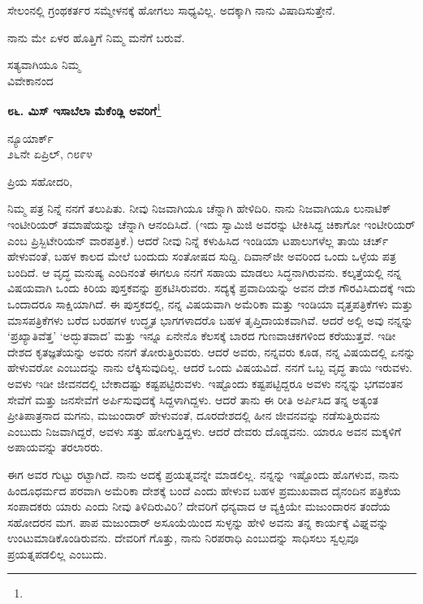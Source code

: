 ಸೇಲಂನಲ್ಲಿ ಗ್ರಂಥಕರ್ತರ ಸಮ್ಮೇಳನಕ್ಕೆ ಹೋಗಲು ಸಾಧ್ಯವಿಲ್ಲ. ಅದಕ್ಕಾಗಿ ನಾನು ವಿಷಾದಿಸುತ್ತೇನೆ.

ನಾನು ಮೇ ಏಳರ ಹೊತ್ತಿಗೆ ನಿಮ್ಮ ಮನೆಗೆ ಬರುವೆ.

\vspace{-0.5cm}

{\flushright
ಸತ್ಯವಾಗಿಯೂ ನಿಮ್ಮ\\ವಿವೇಕಾನಂದ\par}

\begin{center}
\textbf{೮೬. ಮಿಸ್ ಇಸಾಬೆಲಾ ಮೆಕೆಂಡ್ಲಿ ಅವರಿಗೆ}\footnote{}
\end{center}

\vspace{-0.5cm}

\begin{flushright}
ನ್ಯೂಯಾರ್ಕ್\\೨೬ನೇ ಏಪ್ರಿಲ್, ೧೮೯೪
\end{flushright}

\noindent
ಪ್ರಿಯ ಸಹೋದರಿ,

ನಿಮ್ಮ ಪತ್ರ ನಿನ್ನೆ ನನಗೆ ತಲುಪಿತು. ನೀವು ನಿಜವಾಗಿಯೂ ಚೆನ್ನಾಗಿ ಹೇಳಿದಿರಿ. ನಾನು ನಿಜವಾಗಿಯೂ ಲುನಾಟಿಕ್ ಇಂಟೀರಿಯರ್‌ ತಮಾಷೆಯನ್ನು ಚೆನ್ನಾಗಿ ಆನಂದಿಸಿದೆ. (ಇದು ಸ್ವಾಮಿಜಿ ಅವರನ್ನು ಟೀಕಿಸಿದ್ದ ಚಿಕಾಗೋ ಇಂಟೀರಿಯರ್‌ ಎಂಬ ಪ್ರಿಸ್ಬಿಟೇರಿಯನ್ ವಾರಪತ್ರಿಕೆ.) ಆದರೆ ನೀವು ನಿನ್ನೆ ಕಳುಹಿಸಿದ ಇಂಡಿಯಾ ಟಪಾಲುಗಳೆಲ್ಲ ತಾಯಿ ಚರ್ಚ್ ಹೇಳುವಂತೆ, ಬಹಳ ಕಾಲದ ಮೇಲೆ ಬಂದುದು ಸಂತೋಷದ ಸುದ್ದಿ. ದಿವಾನ್‌ಜೀ ಅವರಿಂದ ಒಂದು ಒಳ್ಳೆಯ ಪತ್ರ ಬಂದಿದೆ. ಆ ವೃದ್ಧ ಮನುಷ್ಯ ಎಂದಿನಂತೆ ಈಗಲೂ ನನಗೆ ಸಹಾಯ ಮಾಡಲು ಸಿದ್ಧನಾಗಿರುವನು. ಕಲ್ಕತ್ತೆಯಲ್ಲಿ ನನ್ನ ವಿಷಯವಾಗಿ ಒಂದು ಕಿರಿಯ ಪುಸ್ತಕವನ್ನು ಪ್ರಕಟಿಸಿರುವರು. ಸದ್ಯಕ್ಕೆ ಪ್ರವಾದಿಯನ್ನು ಅವನ ದೇಶ ಗೌರವಿಸಿದುದಕ್ಕೆ ಇದು ಒಂದಾದರೂ ಸಾಕ್ಷಿಯಾಗಿದೆ. ಈ ಪುಸ್ತಕದಲ್ಲಿ, ನನ್ನ ವಿಷಯವಾಗಿ ಅಮೆರಿಕಾ ಮತ್ತು ಇಂಡಿಯಾ ವೃತ್ತಪತ್ರಿಕೆಗಳು ಮತ್ತು ಮಾಸಪತ್ರಿಕೆಗಳು ಬರೆದ ಬರಹಗಳ ಉದ್ಧೃತ ಭಾಗಗಳಾದರೊ ಬಹಳ ತೃಪ್ತಿದಾಯಕವಾಗಿವೆ. ಆದರೆ ಅಲ್ಲಿ ಅವು ನನ್ನನ್ನು ‘ಪ್ರಖ್ಯಾತಿವೆತ್ತ’ ‘ಅದ್ಭುತವಾದ’ ಮತ್ತು ಇನ್ನೂ ಏನೇನೊ ಕೆಲಸಕ್ಕೆ ಬಾರದ ಗುಣವಾಚಕಗಳಿಂದ ಕರೆಯುತ್ತವೆ. ಇಡೀ ದೇಶದ ಕೃತಜ್ಞತೆಯನ್ನು ಅವರು ನನಗೆ ತೋರುತ್ತಿರುವರು. ಆದರೆ ಅವರು, ನನ್ನವರು ಕೂಡ, ನನ್ನ ವಿಷಯದಲ್ಲಿ ಏನನ್ನು ಹೇಳುವರೋ ಎಂಬುದನ್ನು ನಾನು ಲೆಕ್ಕಿಸುವುದಿಲ್ಲ. ಆದರೆ ಒಂದು ವಿಷಯವಿದೆ. ನನಗೆ ಒಬ್ಬ ವೃದ್ಧ ತಾಯಿ ಇರುವಳು. ಅವಳು ಇಡೀ ಜೀವನದಲ್ಲಿ ಬೇಕಾದಷ್ಟು ಕಷ್ಟಪಟ್ಟಿರುವಳು. ಇಷ್ಟೊಂದು ಕಷ್ಟಪಟ್ಟಿದ್ದರೂ ಅವಳು ನನ್ನನ್ನು ಭಗವಂತನ ಸೇವೆಗೆ ಮತ್ತು ಜನಸೇವೆಗೆ ಅರ್ಪಿಸುವುದಕ್ಕೆ ಸಿದ್ದಳಾಗಿದ್ದಳು. ಆದರೆ ತಾನು ಈ ರೀತಿ ಅರ್ಪಿಸಿದ ತನ್ನ ಅತ್ಯಂತ ಪ್ರೀತಿಪಾತ್ರನಾದ ಮಗನು, ಮಜುಂದಾರ್‌ ಹೇಳುವಂತೆ, ದೂರದೇಶದಲ್ಲಿ ಹೀನ ಜೀವನವನ್ನು ನಡೆಸುತ್ತಿರುವನು ಎಂಬುದು ನಿಜವಾಗಿದ್ದರೆ, ಅವಳು ಸತ್ತು ಹೋಗುತ್ತಿದ್ದಳು. ಆದರೆ ದೇವರು ದೊಡ್ಡವನು. ಯಾರೂ ಅವನ ಮಕ್ಕಳಿಗೆ ಅಪಾಯವನ್ನು ತರಲಾರರು.
\vspace{0.1cm}

ಈಗ ಅವರ ಗುಟ್ಟು ರಟ್ಟಾಗಿದೆ. ನಾನು ಅದಕ್ಕೆ ಪ್ರಯತ್ನವನ್ನೇ ಮಾಡಲಿಲ್ಲ. ನನ್ನನ್ನು ಇಷ್ಟೊಂದು ಹೊಗಳುವ, ನಾನು ಹಿಂದೂಧರ್ಮದ ಪರವಾಗಿ ಅಮೆರಿಕಾ ದೇಶಕ್ಕೆ ಬಂದೆ ಎಂದು ಹೇಳುವ ಬಹಳ ಪ್ರಮುಖವಾದ ದೈನಂದಿನ ಪತ್ರಿಕೆಯ ಸಂಪಾದಕರು ಯಾರು ಎಂದು ನೀವು ತಿಳಿದಿರುವಿರಿ? ದೇವರಿಗೆ ಧನ್ಯವಾದ \enginline{-} ಆ ವ್ಯಕ್ತಿಯೇ ಮಜುಂದಾರನ ತಂದೆಯ ಸಹೋದರನ ಮಗ. ಪಾಪ ಮಜುಂದಾರ್ \enginline{-} ಅಸೂಯೆಯಿಂದ ಸುಳ್ಳನ್ನು ಹೇಳಿ ಅವನು ತನ್ನ ಕಾರ್ಯಕ್ಕೆ ವಿಘ್ನವನ್ನು ಉಂಟುಮಾಡಿಕೊಂಡಿರುವನು. ದೇವರಿಗೆ ಗೊತ್ತು, ನಾನು ನಿರಪರಾಧಿ ಎಂಬುದನ್ನು ಸಾಧಿಸಲು ಸ್ವಲ್ಪವೂ ಪ್ರಯತ್ನಪಡಲಿಲ್ಲ ಎಂಬುದು.
\vspace{0.1cm}


